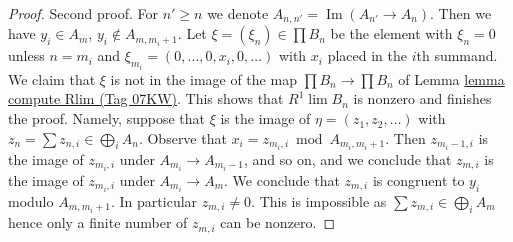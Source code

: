 \documentclass{amsart}
\theoremstyle{plain}
\theoremstyle{definition}
\theoremstyle{remark}
\numberwithin{equation}{subsection}
\def\lim{\mathop{\mathrm{lim}}\nolimits}
\def\Im{\mathop{\mathrm{Im}}}
\begin{document}
\begin{proof}
\medskip\noindent
Second proof. For $n' \geq n$ we denote $A_{n, n'} = \Im(A_{n'} \to A_n)$.
Then we have $y_i \in A_m$, $y_i \not \in A_{m, m_i + 1}$.
Let $\xi = (\xi_n) \in \prod B_n$ be the element with
$\xi_n = 0$ unless $n = m_i$ and $\xi_{m_i} = (0, \ldots, 0, x_i, 0, \ldots)$
with $x_i$ placed in the $i$th summand. We claim that $\xi$ is not in the
image of the map $\prod B_n \to \prod B_n$ of Lemma \href{https://stacks.math.columbia.edu/tag/07KW}{lemma compute Rlim (Tag 07KW)}.
This shows that $R^1\lim B_n$ is nonzero and finishes the proof.
Namely, suppose that $\xi$ is the image of $\eta = (z_1, z_2, \ldots)$
with $z_n = \sum z_{n, i} \in \bigoplus_i A_n$.
Observe that $x_i = z_{m_i, i} \bmod A_{m_i, m_i + 1}$.
Then $z_{m_i - 1, i}$ is the image of $z_{m_i, i}$ under
$A_{m_i} \to A_{m_i - 1}$, and so on, and we conclude that
$z_{m, i}$ is the image of $z_{m_i, i}$ under $A_{m_i} \to A_m$.
We conclude that $z_{m, i}$ is congruent to $y_i$ modulo
$A_{m, m_i + 1}$. In particular $z_{m, i} \not = 0$.
This is impossible as $\sum z_{m, i} \in \bigoplus_i A_m$
hence only a finite number of $z_{m, i}$ can be nonzero.
\end{proof}
\end{document}
